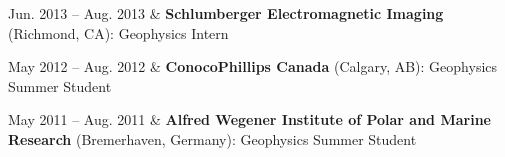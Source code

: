 \documentclass[a4paper, 11pt]{article}
\begin{document}
\begin{entryrightwide}
    Jun. 2013 -- Aug. 2013 & \textbf{Schlumberger Electromagnetic Imaging} (Richmond, CA): Geophysics Intern \\
\end{entryrightwide}



\begin{entryrightwide}
    May 2012 -- Aug. 2012 & \textbf{ConocoPhillips Canada} (Calgary, AB): Geophysics Summer Student \\
\end{entryrightwide}



\begin{entryrightwide}
    May 2011 -- Aug. 2011 & \textbf{Alfred Wegener Institute of Polar and Marine Research} (Bremerhaven, Germany): Geophysics Summer Student \\
\end{entryrightwide}
\end{document}
